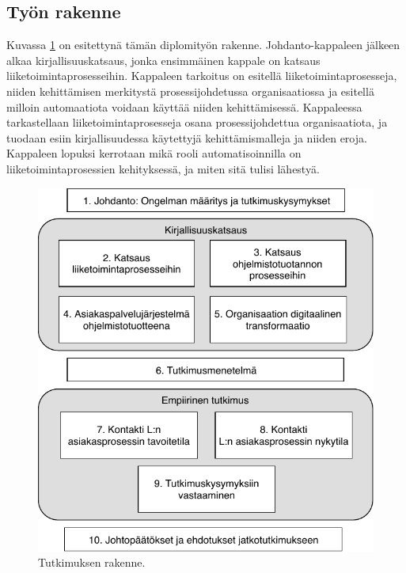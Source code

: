 \documentclass[finnish,12pt,a4paper,pdftex]{article}
\begin{document}

\subsection{Työn rakenne}

Kuvassa \ref{fig:rakenne} on esitettynä tämän diplomityön rakenne. Johdanto-kappaleen jälkeen alkaa kirjallisuuskatsaus, jonka ensimmäinen kappale on katsaus liiketoimintaprosesseihin. Kappaleen tarkoitus on esitellä liiketoimintaprosesseja, niiden kehittämisen merkitystä prosessijohdetussa organisaatiossa ja esitellä milloin automaatiota voidaan käyttää niiden kehittämisessä. Kappaleessa tarkastellaan liiketoimintaprosesseja osana prosessijohdettua organisaatiota, ja tuodaan esiin kirjallisuudessa käytettyjä kehittämismalleja ja niiden eroja. Kappaleen lopuksi kerrotaan mikä rooli automatisoinnilla on liiketoimintaprosessien kehityksessä, ja miten sitä tulisi lähestyä. \\

\begin{figure}[!h]
    \centering
    \includegraphics[scale=0.9]{images/tutrakenne.pdf}
    \caption{Tutkimuksen rakenne. }
    \label{fig:rakenne}
\end{figure}
\end{document}
